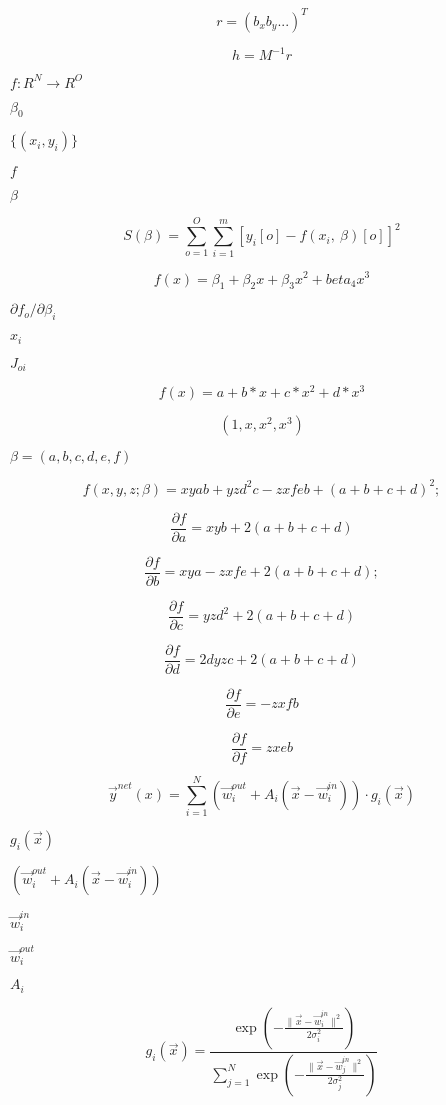 \documentclass{article}
\begin{document}
\[ r = ( b_x b_y ... )^T \]
\pagebreak

\[ h = M^{-1} r \]
\pagebreak

$ f : R^N \rightarrow R^O $
\pagebreak

$ \beta_0 $
\pagebreak

$ \{(x_i,y_i)\}$
\pagebreak

$ f $
\pagebreak

$ \beta $
\pagebreak

\[ S(\beta) = \sum_{o=1}^O \sum_{i=1}^m [y_i[o] - f(x_i, \ \beta)[o] ]^2 \]
\pagebreak

\[ f(x) = \beta_1 + \beta_2 x + \beta_3 x^2 + beta_4 x^3 \]
\pagebreak

$ \partial f_o / \partial \beta_i$
\pagebreak

$ x_i $
\pagebreak

$ J_{oi} $
\pagebreak

\[ f(x) = a + b*x + c*x^2 + d*x^3 \]
\pagebreak

\[ ( 1, x, x^2, x^3 ) \]
\pagebreak

$ \beta = (a,b,c,d,e,f) $
\pagebreak

\[ f(x,y,z;\beta) = xyab + yzd^2c - zxfeb + (a + b + c + d)^2; \]
\pagebreak

\[ \frac{\partial f}{\partial a} = xyb + 2 (a + b + c + d) \]
\pagebreak

\[ \frac{\partial f}{\partial b} = xya - zxfe + 2 (a + b + c + d); \]
\pagebreak

\[ \frac{\partial f}{\partial c} = yzd^2 + 2 (a + b + c + d)\]
\pagebreak

\[ \frac{\partial f}{\partial d} = 2dyzc + 2 (a + b + c + d)\]
\pagebreak

\[ \frac{\partial f}{\partial e} = -zxfb \]
\pagebreak

\[ \frac{\partial f}{\partial f} = zxeb \]
\pagebreak

\[ \vec{y}^{net}(x) = \sum\limits_{i=1}^N ( \vec{w}_i^{out}+A_i ( \vec{x}-\vec{w}_i^{in} ) ) \cdot g_i(\vec{x}) \]
\pagebreak

$g_i(\vec{x})$
\pagebreak

$ ( \vec{w}_i^{out}+A_i ( \vec{x}-\vec{w}_i^{in} ) ) $
\pagebreak

$\vec{w}_i^{in}$
\pagebreak

$\vec{w}_i^{out}$
\pagebreak

$A_i$
\pagebreak

\[ g_i(\vec{x}) = \frac{\exp(-\frac{\|\vec{x}-\vec{w}_i^{in}\|^2}{2\sigma_i^2})} {\sum\limits_{j=1}^N \exp(-\frac{\|\vec{x}-\vec{w}_j^{in}\|^2}{2\sigma_j^2})} \]
\pagebreak
\end{document}
